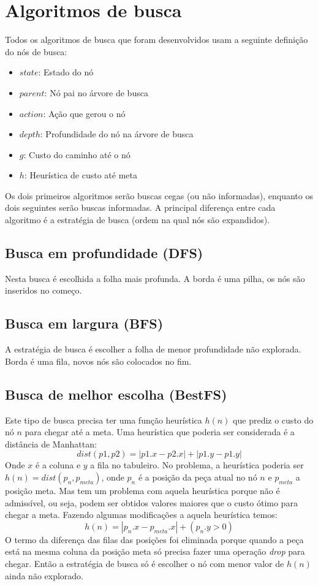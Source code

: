 \section{Algoritmos de busca}
\label{sec:algorithms}

Todos os algoritmos de busca que foram desenvolvidos usam a seguinte definição do nós de busca:
\begin{itemize}
	\item $state$: Estado do nó
	\item $parent$: Nó pai no árvore de busca
	\item $action$: Ação que gerou o nó
	\item $depth$: Profundidade do nó na árvore de busca
	\item $g$: Custo do caminho até o nó
	\item $h$: Heurística de custo até meta
\end{itemize}
Os dois primeiros algoritmos serão buscas cegas (ou não informadas), enquanto os dois seguintes serão buscas informadas. A principal diferença entre cada algoritmo é a estratégia de busca (ordem na qual nós são expandidos).

\subsection{Busca em profundidade (DFS)}
\label{subsec:dfs}
Nesta busca é escolhida a folha mais profunda. A borda é uma pilha, os nós são inseridos no começo.

\subsection{Busca em largura (BFS)}
\label{subsec:bfs}
A estratégia de busca é escolher a folha de menor profundidade não explorada. Borda é uma fila, novos nós são colocados no fim.

\subsection{Busca de melhor escolha (BestFS)}
\label{subsec:bestfs}
Este tipo de busca precisa ter uma função heurística $h( n )$ que prediz o custo do nó $n$ para chegar até a meta. Uma heurística que poderia ser considerada é a distância de Manhattan:
	\[ {dist}( p1 , p2 ) = | p1.x - p2.x | + | p1.y - p1.y | \]
Onde $x$ é a coluna e $y$ a fila no tabuleiro. No problema, a heurística poderia ser $h( n ) = {dist}( p_n , p_{meta} )$, onde $p_n$ é a posição da peça atual no nó $n$ e $p_{meta}$ a posição meta. Mas tem um problema com aquela heurística porque não é admissível, ou seja, podem ser obtidos valores maiores que o custo ótimo para chegar a meta. Fazendo algumas modificações a aquela heurística temos:
	\[ h( n ) = | p_n.x - p_{meta}.x | + ( p_n.y > 0 ) \]
O termo da diferença das filas das posições foi eliminada porque quando a peça está na mesma coluna da posição meta só precisa fazer uma operação \textit{drop} para chegar. Então a estratégia de busca só é escolher o nó com menor valor de $h( n )$ ainda não explorado.
	
